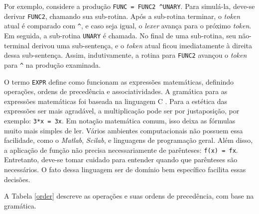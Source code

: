 Por exemplo, considere a produção \texttt{FUNC = FUNC2 \textasciicircum UNARY}.
Para simulá-la, deve-se derivar \texttt{FUNC2}, chamando sua sub-rotina.
Após a sub-rotina terminar, o \textit{token} atual é comparado com \texttt{\textasciicircum},
e caso seja igual, o \textit{lexer} avança para o próximo \textit{token}.
Em seguida, a sub-rotina \texttt{UNARY} é chamada.
No final de uma sub-rotina, seu não-terminal derivou uma sub-sentença,
e o \textit{token} atual ficou imediatamente à direita dessa sub-sentença.
Assim, indutivamente, a rotina para \texttt{FUNC2} avançou
o \textit{token} para \texttt{\textasciicircum} na produção examinada.

O termo \texttt{EXPR} define como funcionam as expressões matemáticas,
definindo operações, ordens de precedência e associatividades.
A gramática para as expressões matemáticas foi baseada na linguagem C \cite{CGram}.
Para a estética das expressões ser mais agradável, a multiplicação pode ser
por justaposição, por exemplo: \texttt{3*x = 3x}.
Em notação matemática comum, isso deixa as fórmulas muito mais simples de ler.
Vários ambientes computacionais não possuem essa facilidade,
como o \textit{Matlab}, \textit{Scilab}, e linguagens de programação geral.
Além disso, a aplicação de função não precisa
necessariamente de parênteses: \texttt{f(x) = fx}.
Entretanto, deve-se tomar cuidado para entender
quando que parênteses são necessários.
O fato dessa linguagem ser de domínio bem específico facilita essas decisões.

A Tabela \ref{order} descreve as operações e suas ordens de precedência,
com base na gramática.

